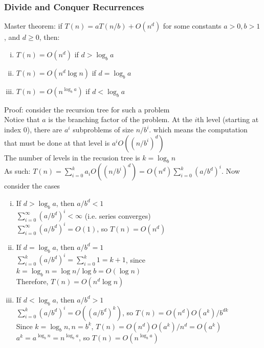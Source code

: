 \documentclass{article}
\begin{document}
			\subsubsection{Divide and Conquer Recurrences}
				Master theorem: if $T(n) = aT(n/b) + O(n^d)$ for some constants $a > 0, b > 1$, and $d \geq 0$, then:
				\begin{enumerate}[(i)]
					\item $T(n) = O(n^d)$ if $d > \log_b a$
					\item $T(n) = O(n^d \log n)$ if $d = \log_b a$
					\item $T(n) = O(n^{\log_b a})$ if $d < \log_b a$
					\end{enumerate}
				Proof: consider the recursion tree for such a problem \\
				Notice that $a$ is the branching factor of the problem. At the $i$th level (starting at index 0), there are $a^i$ subproblems of size $n/b^i$. which means the computation that must be done at that level is $a^iO((n/b^i)^d)$ \\
				The number of levels in the recusion tree is $k = \log_b n$ \\
				As such: $T(n) = \sum_{i = 0}^k a_iO((n/b^i)^d) = O(n^d)\sum_{i = 0}^k(a/b^d)^i$. Now consider the cases
				\begin{enumerate}[(i)]
					\item If $d > \log_b a$, then $a/b^d < 1$ \\
					$\sum_{i = 0}^\infty (a/b^d)^i < \infty$ (i.e. series converges) \\
					$\sum_{i = 0}^\infty (a/b^d)^i = O(1)$, so $T(n) = O(n^d)$
					\item If $d = \log_b a$, then $a/b^d = 1$ \\
					$\sum_{i = 0}^k (a/b^d)^i = \sum_{i = 0}^k 1 = k + 1$, since $k = \log_b n = \log n/\log b = O(\log n)$ \\
					Therefore, $T(n) = O(n^d\log n)$
					\item If $d < \log_b a$, then $a/b^d > 1$ \\
					$\sum_{i = 0}^k (a/b^d)^i = O((a/b^d)^k)$, so $T(n) = O(n^d)O(a^k)/b^{dk}$ \\
					Since $k = \log_b n, n = b^k$, $T(n) = O(n^d)O(a^k)/n^d = O(a^k)$ \\
					$a^k = a^{\log_b n} = n^{\log_b a}$, so $T(n) = O(n^{\log_b a})$
					\end{enumerate}
\end{document}
